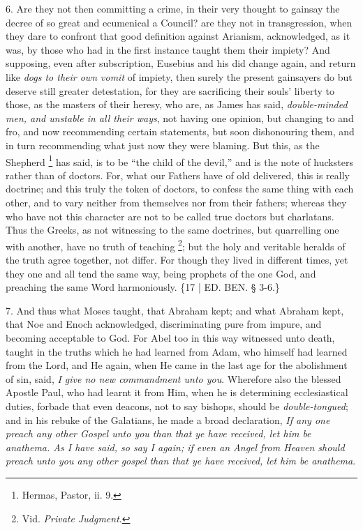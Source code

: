 6. Are they not then
committing a crime, in their very thought to gainsay the decree of so
great and ecumenical a Council? are they not in transgression, when
they dare to confront that good definition against Arianism,
acknowledged, as it was, by those who had in the first instance taught
them their impiety? And supposing, even after subscription, Eusebius
and his did change again, and return like \emph{dogs to their own vomit}
of impiety, then surely the present gainsayers do but deserve still
greater detestation, for they are sacrificing their souls' liberty to
those, as the masters of their heresy, who are, as James has said, \emph{double-minded
men, and unstable in all their ways}, not having one opinion, but
changing to and fro, and now recommending certain statements, but soon
dishonouring them, and in turn recommending what just now they were
blaming. But this, as the Shepherd \footnote{Hermas, Pastor, ii. 9.} has said, is to be ``the child of the devil,'' and is the note
of hucksters rather than of doctors. For, what our Fathers have of old
delivered, this is really doctrine; and this truly the token of
doctors, to confess the same thing with each other, and to vary
neither from themselves nor from their fathers; whereas they who have
not this character are not to be called true doctors but charlatans.
Thus the Greeks, as not witnessing to the same doctrines, but
quarrelling one with another, have no truth of teaching \footnote{Vid. \emph{Private Judgment}.}; but the holy and veritable heralds of the truth agree
together, not differ. For though they lived in different times, yet
they one and all tend the same way, being prophets of the one God, and
preaching the same Word harmoniously. \{17 | ED. BEN.
§ 3-6.\}

7. And thus what Moses taught,
that Abraham kept; and what Abraham kept, that Noe and Enoch
acknowledged, discriminating pure from impure, and becoming acceptable
to God. For Abel too in this way witnessed unto death, taught in the
truths which he had learned from Adam, who himself had learned from
the Lord, and He again, when He came in the last age for the
abolishment of sin, said, \emph{I give no new commandment unto you}.
Wherefore also the blessed Apostle Paul, who had learnt it from Him,
when he is determining ecclesiastical duties, forbade that even
deacons, not to say bishops, should be \emph{double-tongued}; and in
his rebuke of the Galatians, he made a broad declaration, \emph{If any
one preach any other Gospel unto you than that ye have received, let
him be anathema. As I have said, so say I again; if even an Angel from
Heaven should preach unto you any other gospel than that ye have
received, let him be anathema}.

